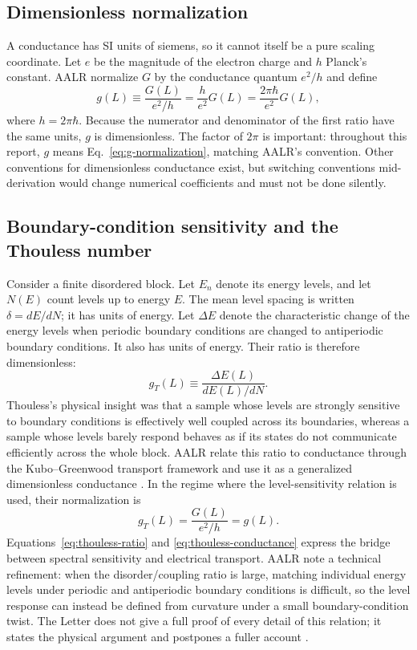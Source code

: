 \documentclass[11pt,a4paper]{article}
\numberwithin{equation}{section}
\begin{document}
\subsection{Dimensionless normalization}

A conductance has SI units of siemens, so it cannot itself be a pure scaling coordinate. Let $e$ be the magnitude of the electron charge and $h$ Planck's constant. AALR normalize $G$ by the conductance quantum $e^2/h$ and define
\begin{equation}
    g(L) \equiv \frac{G(L)}{e^2/h}
           = \frac{h}{e^2}G(L)
           = \frac{2\pi\hbar}{e^2}G(L),
    \label{eq:g-normalization}
\end{equation}
where $h=2\pi\hbar$. Because the numerator and denominator of the first ratio have the same units, $g$ is dimensionless. The factor of $2\pi$ is important: throughout this report, $g$ means Eq.~\eqref{eq:g-normalization}, matching AALR's convention. Other conventions for dimensionless conductance exist, but switching conventions mid-derivation would change numerical coefficients and must not be done silently.

\subsection{Boundary-condition sensitivity and the Thouless number}

Consider a finite disordered block. Let $E_n$ denote its energy levels, and let $N(E)$ count levels up to energy $E$. The mean level spacing is written $\delta=dE/dN$; it has units of energy. Let $\Delta E$ denote the characteristic change of the energy levels when periodic boundary conditions are changed to antiperiodic boundary conditions. It also has units of energy. Their ratio is therefore dimensionless:
\begin{equation}
    g_T(L) \equiv \frac{\Delta E(L)}{dE(L)/dN}.
    \label{eq:thouless-ratio}
\end{equation}
Thouless's physical insight was that a sample whose levels are strongly sensitive to boundary conditions is effectively well coupled across its boundaries, whereas a sample whose levels barely respond behaves as if its states do not communicate efficiently across the whole block. AALR relate this ratio to conductance through the Kubo--Greenwood transport framework and use it as a generalized dimensionless conductance \cite{Thouless1974,AALR1979}. In the regime where the level-sensitivity relation is used, their normalization is
\begin{equation}
    g_T(L)=\frac{G(L)}{e^2/h}=g(L).
    \label{eq:thouless-conductance}
\end{equation}
Equations~\eqref{eq:thouless-ratio} and \eqref{eq:thouless-conductance} express the bridge between spectral sensitivity and electrical transport. AALR note a technical refinement: when the disorder/coupling ratio is large, matching individual energy levels under periodic and antiperiodic boundary conditions is difficult, so the level response can instead be defined from curvature under a small boundary-condition twist. The Letter does not give a full proof of every detail of this relation; it states the physical argument and postpones a fuller account \cite{AALR1979}.
\end{document}
